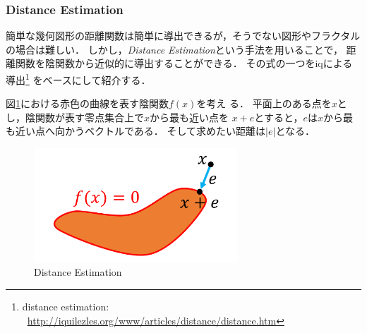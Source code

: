 \subsubsection{Distance Estimation}

簡単な幾何図形の距離関数は簡単に導出できるが，そうでない図形やフラクタル
の場合は難しい．
しかし，\textit{Distance Estimation}という手法を用いることで，
距離関数を陰関数から近似的に導出することができる．
その式の一つをiqによる導出\footnote{distance estimation:
~\url{http://iquilezles.org/www/articles/distance/distance.htm}}
をベースにして紹介する．

図\ref{fig:distance-estimate}における赤色の曲線を表す陰関数$f(x)$を考え
る．
平面上のある点を$x$とし，陰関数が表す零点集合上で$x$から最も近い点を
$x + e$とすると，$e$は$x$から最も近い点へ向かうベクトルである．
そして求めたい距離は$|e|$となる．
 \begin{figure}[htbp]
  \center
  \includegraphics[width=3in, keepaspectratio]{../img/fractal/distance-estimate.pdf}
  \caption{Distance Estimation}
  \label{fig:distance-estimate}
 \end{figure}

